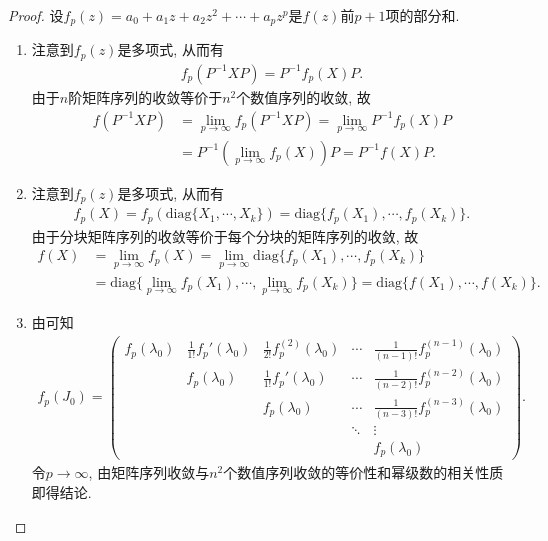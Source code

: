 \documentclass[../../main.tex]{subfiles}
\begin{document}
\begin{proof}
设\(f_p(z)=a_0 + a_1z + a_2z^2 + \cdots + a_pz^p\)是\(f(z)\)前\(p + 1\)项的部分和.
\begin{enumerate}[(1)]
\item 注意到\(f_p(z)\)是多项式, 从而有
\begin{align*}
f_p(P^{-1}XP) = P^{-1}f_p(X)P.
\end{align*}
由于\(n\)阶矩阵序列的收敛等价于\(n^2\)个数值序列的收敛, 故
\begin{align*}
f(P^{-1}XP) &= \lim_{p \to \infty} f_p(P^{-1}XP) = \lim_{p \to \infty} P^{-1}f_p(X)P \\
&= P^{-1}(\lim_{p \to \infty} f_p(X))P = P^{-1}f(X)P.
\end{align*}

\item  注意到\(f_p(z)\)是多项式, 从而有
\begin{align*}
f_p(X) = f_p(\mathrm{diag}\{X_1,\cdots,X_k\}) = \mathrm{diag}\{f_p(X_1),\cdots,f_p(X_k)\}.
\end{align*}
由于分块矩阵序列的收敛等价于每个分块的矩阵序列的收敛, 故
\begin{align*}
f(X) &= \lim_{p \to \infty} f_p(X) = \lim_{p \to \infty} \mathrm{diag}\{f_p(X_1),\cdots,f_p(X_k)\} \\
&= \mathrm{diag}\{\lim_{p \to \infty} f_p(X_1),\cdots,\lim_{p \to \infty} f_p(X_k)\} = \mathrm{diag}\{f(X_1),\cdots,f(X_k)\}.
\end{align*}

\item  由可知
\begin{align*}
f_p(J_0)= \begin{pmatrix}
f_p(\lambda_0) & \frac{1}{1!}f_p'(\lambda_0) & \frac{1}{2!}f_p^{(2)}(\lambda_0) & \cdots & \frac{1}{(n - 1)!}f_p^{(n - 1)}(\lambda_0) \\
 & f_p(\lambda_0) & \frac{1}{1!}f_p'(\lambda_0) & \cdots & \frac{1}{(n - 2)!}f_p^{(n - 2)}(\lambda_0) \\
 & & f_p(\lambda_0) & \cdots & \frac{1}{(n - 3)!}f_p^{(n - 3)}(\lambda_0) \\
 & & & \ddots & \vdots \\
 & & & & f_p(\lambda_0)
\end{pmatrix}. 
\end{align*}
令\(p \to \infty\), 由矩阵序列收敛与\(n^2\)个数值序列收敛的等价性和幂级数的相关性质即得结论.
\end{enumerate}
\end{proof}
\end{document}
